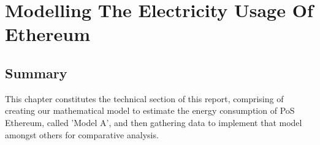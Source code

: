 \chapter{Modelling The Electricity Usage Of Ethereum}
\label{Modelling}

\section{Summary}

This chapter constitutes the technical section of this report, comprising of creating our mathematical model to estimate the energy consumption of PoS Ethereum, called 'Model A', and then gathering data to implement that model amongst others for comparative analysis. 




    
    
    
    
